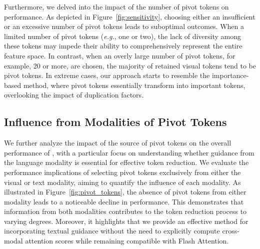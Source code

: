 
Furthermore, we delved into the impact of the number of pivot tokens on performance. 
As depicted in Figure~\ref{fig:sensitivity}, choosing either an insufficient or an excessive number of pivot tokens leads to suboptimal outcomes.
When a limited number of pivot tokens (\emph{e.g.}, one or two), the lack of diversity among these tokens may impede their ability to comprehensively represent the entire feature space. In contrast, when an overly large number of pivot tokens, for example, 20 or more, are chosen, the majority of retained visual tokens tend to be pivot tokens. In extreme cases, our approach starts to resemble the importance-based method, where pivot tokens essentially transform into important tokens, overlooking the impact of duplication factors.


\subsection{Influence from Modalities of Pivot Tokens}
We further analyze the impact of the source of pivot tokens on the overall performance of \algname, with a particular focus on understanding whether guidance from the language modality is essential for effective token reduction. 
We evaluate the performance implications of selecting pivot tokens exclusively from either the visual or text modality, aiming to quantify the influence of each modality.
As illustrated in Figure~\ref{fig:pivot_tokens}, the absence of pivot tokens from either modality leads to a noticeable decline in performance. 
This demonstrates that information from both modalities contributes to the token reduction process to varying degrees. Moreover, it highlights that we provide an effective method for incorporating textual guidance without the need to explicitly compute cross-modal attention scores while remaining compatible with Flash Attention.



